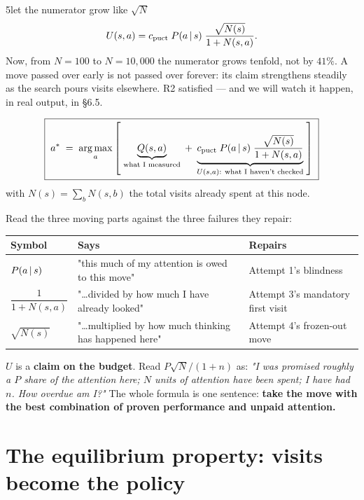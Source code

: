 \begin{attempt}{5}{let the numerator grow like $\sqrt{N}$}
\[
  U(s,a) = c_{\text{puct}}\;P(a\,|\, s)\;\frac{\sqrt{N(s)}}{1 + N(s,a)} .
\]
Now, from $N = 100$ to $N = 10{,}000$ the numerator grows tenfold, not by $41\%$. A move
passed over early is not passed over forever: its claim strengthens steadily as the search
pours visits elsewhere. R2 satisfied --- and we will watch it happen, in real output, in §6.5.
\end{attempt}

\begin{finalform}
\begin{equation}
  \label{eq:puct}
  \boxed{\;
  a^{*} \;=\; \operatorname*{arg\,max}_{a}\left[\;
  \underbrace{Q(s,a)}_{\text{what I measured}}
  \;+\;
  \underbrace{c_{\text{puct}}\;P(a\,|\, s)\;\frac{\sqrt{N(s)}}{1+N(s,a)}}_{U(s,a):\ \text{what I haven't checked}}
  \;\right]\;}
\end{equation}
with $N(s) = \sum_b N(s,b)$ the total visits already spent at this node.
\end{finalform}

Read the three moving parts against the three failures they repair:

\begin{center}
\begin{tabular}{@{}lll@{}}
\toprule
Symbol & Says & Repairs \\
\midrule
$P(a\,|\, s)$ & "this much of my attention is owed to this move" & Attempt 1's blindness \\
$\dfrac{1}{1+N(s,a)}$ & "\ldots divided by how much I have already looked" & Attempt 3's mandatory first visit \\
$\sqrt{N(s)}$ & "\ldots multiplied by how much thinking has happened here" & Attempt 4's frozen-out move \\
\bottomrule
\end{tabular}
\end{center}

\begin{keyidea}
$U$ is a \textbf{claim on the budget}. Read $P\sqrt{N}/(1+n)$ as: \emph{"I was promised
roughly a $P$ share of the attention here; $N$ units of attention have been spent; I have
had $n$. How overdue am I?"} The whole formula is one sentence: \textbf{take the move with
the best combination of proven performance and unpaid attention.}
\end{keyidea}

\section{The equilibrium property: visits become the policy}

